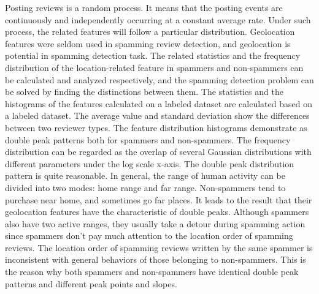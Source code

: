 \begin{bigabstract}
Posting reviews is a random process. It means that the posting events are continuously and independently occurring at a constant average rate. Under such process, the related features will follow a particular distribution. Geolocation features were seldom used in spamming review detection, and geolocation is potential in spamming detection task. The related statistics and the frequency distribution of the location-related feature in spammers and non-spammers can be calculated and analyzed respectively, and the spamming detection problem can be solved by finding the distinctions between them. The statistics and the histograms of the features calculated on a labeled dataset are calculated based on a labeled dataset. The average value and standard deviation show the differences between two reviewer types. The feature distribution histograms demonstrate as double peak patterns both for spammers and non-spammers. The frequency distribution can be regarded as the overlap of several Gaussian distributions with different parameters under the log scale x-axis. The double peak distribution pattern is quite reasonable. In general, the range of human activity can be divided into two modes: home range and far range. Non-spammers tend to purchase near home, and sometimes go far places. It leads to the result that their geolocation features have the characteristic of double peaks. Although spammers also have two active ranges, they usually take a detour during spamming action since spammers don't pay much attention to the location order of spamming reviews. The location order of spamming reviews written by the same spammer is inconsistent with general behaviors of those belonging to non-spammers. This is the reason why both spammers and non-spammers have identical double peak patterns and different peak points and slopes. 


\end{bigabstract}
